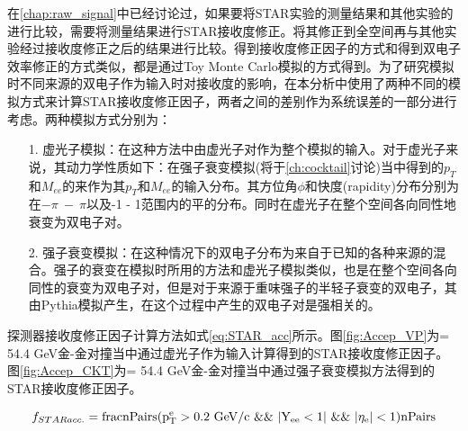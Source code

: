 在\ref{chap:raw_signal}中已经讨论过，如果要将STAR实验的测量结果和其他实验的进行比较，需要将测量结果进行STAR接收度修正。将其修正到全空间再与其他实验经过接收度修正之后的结果进行比较。得到接收度修正因子的方式和得到双电子效率修正的方式类似，都是通过Toy Monte Carlo模拟的方式得到。为了研究模拟时不同来源的双电子作为输入时对接收度的影响，在本分析中使用了两种不同的模拟方式来计算STAR接收度修正因子，两者之间的差别作为系统误差的一部分进行考虑。两种模拟方式分别为：
\begin{itemize}
    \item[1.]虚光子模拟：在这种方法中由虚光子对作为整个模拟的输入。对于虚光子来说，其动力学性质如下：在强子衰变模拟(将于\ref{ch:cocktail}讨论)当中得到的$p_T$和$M_{ee}$的来作为其$p_T$和$M_{ee}$的输入分布。其方位角$\phi$和快度(rapidity)分布分别为在$-\pi~-~\pi$以及-1 - 1范围内的平的分布。同时在虚光子在整个空间各向同性地衰变为双电子对。
    \item[2.]强子衰变模拟：在这种情况下的双电子分布为来自于已知的各种来源的混合。强子的衰变在模拟时所用的方法和虚光子模拟类似，也是在整个空间各向同性的衰变为双电子对，但是对于来源于重味强子的半轻子衰变的双电子，其由Pythia模拟产生，在这个过程中产生的双电子对是强相关的。
\end{itemize}
探测器接收度修正因子计算方法如式\ref{eq:STAR_acc}所示。图\ref{fig:Accep_VP}为\sNN = 54.4 GeV金-金对撞当中通过虚光子作为输入计算得到的STAR接收度修正因子。图\ref{fig:Accep_CKT}为\sNN = 54.4 GeV金-金对撞当中通过强子衰变模拟方法得到的STAR接收度修正因子。

\begin{equation}
    \label{eq:STAR_acc}
    f_{STAR acc.} = \rm{frac{nPairs(p_T^{e} > 0.2~\rm{GeV/c}~\&\&~|Y_{ee} < 1|~\&\&~|\eta_e| < 1)}{nPairs}}
\end{equation}

